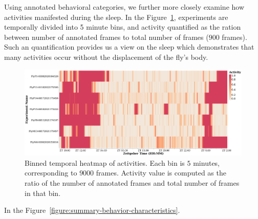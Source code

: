 Using annotated behavioral categories, we further more closely examine how activities manifested during the sleep.
In the Figure~\ref{figure:heatmap-microactivity}, experiments are temporally divided into 5 minute bins, and activity quantified as the ration between number of annotated frames to total number of frames ($900$ frames). Such an quantification provides us a view on the sleep which demonstrates that many activities occur without the displacement of the fly's body.

\begin{figure}[htb!]
	\centering\includegraphics[width=\linewidth]{figures/ActivityBinned-Ann-WT-5T.pdf}
	\caption[Binned temporal heatmap of activities.]{Binned temporal heatmap of activities.
		Each bin is $5$ minutes, corresponding to $9000$ frames.
		Activity value is computed as the ratio of the number of annotated frames and total number of frames in that bin. \label{figure:heatmap-microactivity}}
\end{figure}

In the Figure~\ref{figure:summary-behavior-characteristics}.

